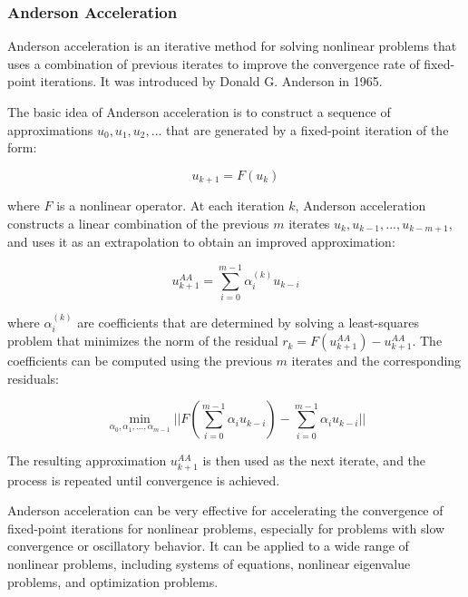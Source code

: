 \subsubsection{Anderson Acceleration}
\label{subsubsec:anderson_acceleration}


Anderson acceleration is an iterative method for solving nonlinear problems that uses a combination of previous iterates to improve the convergence rate of fixed-point iterations. It was introduced by Donald G. Anderson in 1965.

The basic idea of Anderson acceleration is to construct a sequence of approximations $u_0, u_1, u_2, ...$ that are generated by a fixed-point iteration of the form:

\begin{equation}
u_{k+1} = F(u_k)
\end{equation}

where $F$ is a nonlinear operator. At each iteration $k$, Anderson acceleration constructs a linear combination of the previous $m$ iterates $u_k, u_{k-1}, ..., u_{k-m+1}$, and uses it as an extrapolation to obtain an improved approximation:

\begin{equation}
u_{k+1}^{AA} = \sum_{i=0}^{m-1} \alpha_i^{(k)} u_{k-i}
\end{equation}

where $\alpha_i^{(k)}$ are coefficients that are determined by solving a least-squares problem that minimizes the norm of the residual $r_k = F(u_{k+1}^{AA}) - u_{k+1}^{AA}$. The coefficients can be computed using the previous $m$ iterates and the corresponding residuals:

\begin{equation}
\min_{\alpha_0, \alpha_1, ..., \alpha_{m-1}} ||F(\sum_{i=0}^{m-1} \alpha_i u_{k-i}) - \sum_{i=0}^{m-1} \alpha_i u_{k-i}||
\end{equation}

The resulting approximation $u_{k+1}^{AA}$ is then used as the next iterate, and the process is repeated until convergence is achieved.

Anderson acceleration can be very effective for accelerating the convergence of fixed-point iterations for nonlinear problems, especially for problems with slow convergence or oscillatory behavior. It can be applied to a wide range of nonlinear problems, including systems of equations, nonlinear eigenvalue problems, and optimization problems.

